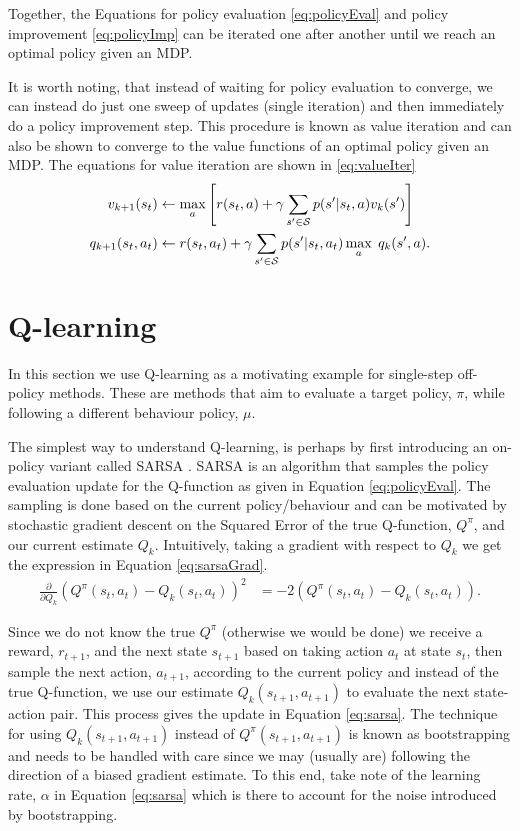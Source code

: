 \documentclass{report}
\numberwithin{equation}{section}
\numberwithin{figure}{section}
\numberwithin{table}{section}
\numberwithin{algorithm}{section}
\begin{document}
Together, the Equations for policy evaluation \ref{eq:policyEval} 
and policy improvement \ref{eq:policyImp} 
can be iterated one after another until we reach an optimal policy 
given an MDP.

It is worth noting, that instead of waiting for policy evaluation 
to converge, we can instead do just one sweep 
of updates (single iteration) and then immediately do a policy 
improvement step. This procedure is known as value iteration and 
can also be shown to converge to the value functions of an 
optimal policy given an MDP. The equations for value iteration 
are shown in \ref{eq:valueIter}
\begin{align}\label{eq:valueIter}
  v_{k+1}(s_t)&\gets\max_a \left[r(s_t, a) 
  + \gamma \sum_{s'\in\mathcal{S}}p(s'|s_t, a)v_{k}(s')\right]\notag\\
  q_{k+1}(s_t, a_t)&\gets r(s_t, a_t) 
  + \gamma \sum_{s'\in\mathcal{S}}p(s'|s_t, a_t)\max_a\; q_{k}(s', a).
\end{align}


\section{Q-learning}\label{sec:Qlearning}
In this section we use Q-learning \citep{QlearningWatkins1992} 
as a motivating example 
for single-step off-policy methods. These are methods 
that aim to evaluate a target policy, $\pi$, while following 
a different behaviour policy, $\mu$.

The simplest way to understand Q-learning, is perhaps by 
first introducing an on-policy variant called SARSA \citep{SARSA}. 
SARSA is an algorithm that samples the policy evaluation update 
for the Q-function as given in Equation \ref{eq:policyEval}.
The sampling is done based on the current policy/behaviour and can 
be motivated by stochastic gradient descent on the Squared Error of 
the true Q-function, $Q^{\pi}$, and our current estimate $Q_{k}$.
Intuitively, taking a gradient with respect to $Q_{k}$ we get the 
expression in Equation \ref{eq:sarsaGrad}.
\begin{align}\label{eq:sarsaGrad}
  \frac{\partial}{\partial Q_{k}}(Q^{\pi}(s_t, a_t) - Q_{k}(s_t, a_t))^2&=-2(Q^{\pi}(s_t, a_t) - Q_{k}(s_t,a_t)).
\end{align}

Since we do not know the true $Q^{\pi}$ (otherwise we would be done) 
we receive a reward, $r_{t+1}$, and the next state $s_{t+1}$ 
based on taking action $a_t$ at state $s_t$, then sample the next 
action, $a_{t+1}$, according to the current policy and instead of the 
true Q-function, we use our estimate $Q_{k}(s_{t+1}, a_{t+1})$ to evaluate 
the next state-action pair. This process gives the update in 
Equation \ref{eq:sarsa}.
The technique for using $Q_{k}(s_{t+1}, a_{t+1})$ instead 
of $Q^{\pi}(s_{t+1}, a_{t+1})$ is known as bootstrapping and needs to be 
handled with care since we may (usually are) following 
the direction of a biased gradient estimate. 
To this end, take note of the learning rate, $\alpha$ in Equation 
\ref{eq:sarsa} which is there to account for the noise introduced 
by bootstrapping.
\end{document}
